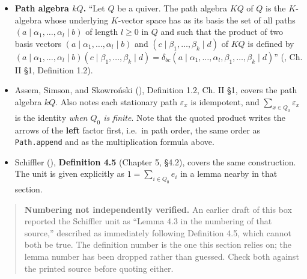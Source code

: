 \begin{itemize}
\tightlist
\item
  \textbf{Path algebra \(kQ\).} ``Let \(Q\) be a quiver. The path algebra \(KQ\) of \(Q\) is the \(K\)-algebra whose underlying \(K\)-vector space has as its basis the set of all paths \((a \mid \alpha_1, \ldots, \alpha_l
  \mid b)\) of length \(l \geq 0\) in \(Q\) and such that the product of two basis vectors \((a \mid \alpha_1, \ldots, \alpha_l \mid b)\) and \((c \mid \beta_1, \ldots, \beta_k \mid d)\) of \(KQ\) is defined by \((a \mid \alpha_1, \ldots, \alpha_l \mid b)(c \mid \beta_1, \ldots,
  \beta_k \mid d) = \delta_{bc}(a \mid \alpha_1, \ldots, \alpha_l,
  \beta_1, \ldots, \beta_k \mid d)\)'' (\cite{AssemSimsonSkowronski2006}, Ch. II §1, Definition 1.2).
\item
  Assem, Simson, and Skowroński (\cite{AssemSimsonSkowronski2006}), Definition 1.2, Ch. II §1, covers the path algebra \(kQ\). Also notes each stationary path \(\varepsilon_x\) is idempotent, and \(\sum_{x\in Q_0}\varepsilon_x\) is the identity \emph{when \(Q_0\) is finite}. Note that the quoted product writes the arrows of the \textbf{left} factor first, i.e.~in path order, the same order as \texttt{Path.append} and as the multiplication formula above.
\item
  Schiffler (\cite{Schiffler2014}), \textbf{Definition 4.5} (Chapter 5, §4.2), covers the same construction. The unit is given explicitly as \(1 = \sum_{i\in Q_0} e_i\) in a lemma nearby in that section.
\end{itemize}

\begin{quote}
\textbf{Numbering not independently verified.} An earlier draft of this box reported the Schiffler unit as ``Lemma 4.3 in the numbering of that source,'' described as immediately following Definition 4.5, which cannot both be true. The definition number is the one this section relies on; the lemma number has been dropped rather than guessed. Check both against the printed source before quoting either.
\end{quote}
